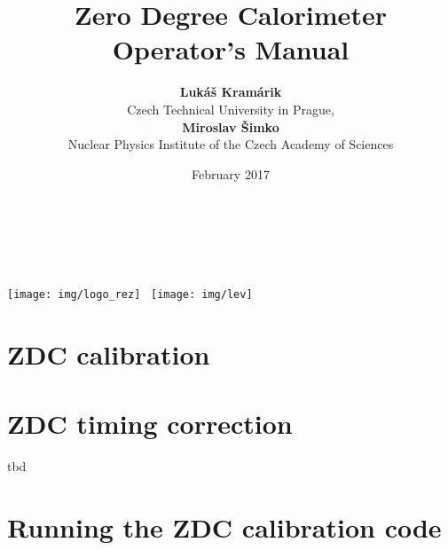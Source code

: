 \documentclass[a4paper,10pt]{report}
\title{Zero Degree Calorimeter Operator's Manual}
\author{\textbf{Lukáš Kramárik}\\
Czech Technical University in Prague,\\[.5cm] 
\textbf{Miroslav Šimko}\\[.4cm]
Nuclear Physics Institute of the Czech Academy of Sciences}
\date{February 2017}
\begin{document}
\makeatletter
\begin{titlepage}
\begin{center}
{\huge \bfseries  \@title }\\[2cm]
{\LARGE  \@author}\\[4ex] 
{\large \@date}\\[50ex]
\texttt{[image: img/logo\_rez]}\hspace*{3cm}~%
\texttt{[image: img/lev]}
\end{center}
\end{titlepage}
\makeatother
\thispagestyle{empty}
\newpage


\tableofcontents


\chapter{ZDC calibration\label{calibration}}


\chapter{ZDC timing correction}
tbd

\chapter{Running the ZDC calibration code\label{code}}




\end{document}
